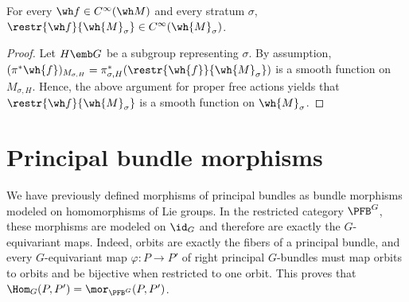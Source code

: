 \begin{prop}
    For every $\wh f\in C^\infty(\wh M)$ and every stratum $\sigma$, $\restr{\wh f}{\wh{M}_\sigma}\in C^\infty(\wh{M}_\sigma)$.
\end{prop}
\begin{proof}
    Let $H\emb G$ be a subgroup representing $\sigma$. By assumption, $(\pi^\ast\wh{f})_{M_{\sigma,H}}=\pi^\ast_{\sigma,H}(\restr{\wh{f}}{\wh{M}_\sigma})$ is a smooth function on $M_{\sigma,H}$. Hence, the above argument for proper free actions yields that $\restr{\wh f}{\wh{M}_\sigma}$ is a smooth function on $\wh{M}_\sigma$.
\end{proof}







\section{Principal bundle morphisms}\label{sec: pfb morphisms}


We have previously defined morphisms of principal bundles as bundle morphisms modeled on homomorphisms of Lie groups. In the restricted category $\PFB^G$, these morphisms are modeled on $\id_G$ and therefore are exactly the $G$-equivariant maps. Indeed, orbits are exactly the fibers of a principal bundle, and every $G$-equivariant map $\varphi:P\to P'$ of right principal $G$-bundles must map orbits to orbits and be bijective when restricted to one orbit. This proves that $\Hom_G(P,P')=\mor_{\PFB^G}(P,P')$.

